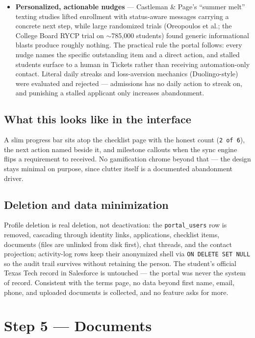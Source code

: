 \documentclass[11pt,letterpaper]{report}
\begin{document}
\begin{itemize}[leftmargin=1.4em]
  \item \textbf{Personalized, actionable nudges} --- Castleman \& Page's
        ``summer melt'' texting studies lifted enrollment with status-aware
        messages carrying a concrete next step, while large randomized trials
        (Oreopoulos et al.; the College Board RYCP trial on $\sim$785{,}000
        students) found generic informational blasts produce roughly nothing.
        The practical rule the portal follows: every nudge names the specific
        outstanding item and a direct action, and stalled students surface to a
        human in Tickets rather than receiving automation-only contact.
        Literal daily streaks and loss-aversion mechanics (Duolingo-style)
        were evaluated and rejected --- admissions has no daily action to
        streak on, and punishing a stalled applicant only increases
        abandonment.
\end{itemize}

\subsection{What this looks like in the interface}

A slim progress bar sits atop the checklist page with the honest count
(\texttt{2 of 6}), the next action named beside it, and milestone callouts
when the sync engine flips a requirement to received. No gamification chrome
beyond that --- the design stays minimal on purpose, since clutter itself is a
documented abandonment driver.

\subsection{Deletion and data minimization}

Profile deletion is real deletion, not deactivation: the \texttt{portal\_users}
row is removed, cascading through identity links, applications, checklist
items, documents (files are unlinked from disk first), chat threads, and the
contact projection; activity-log rows keep their anonymized shell via
\texttt{ON DELETE SET NULL} so the audit trail survives without retaining the
person. The student's official Texas Tech record in Salesforce is untouched ---
the portal was never the system of record. Consistent with the terms page, no
data beyond first name, email, phone, and uploaded documents is collected, and
no feature asks for more.

\section{Step 5 --- Documents}
\end{document}
